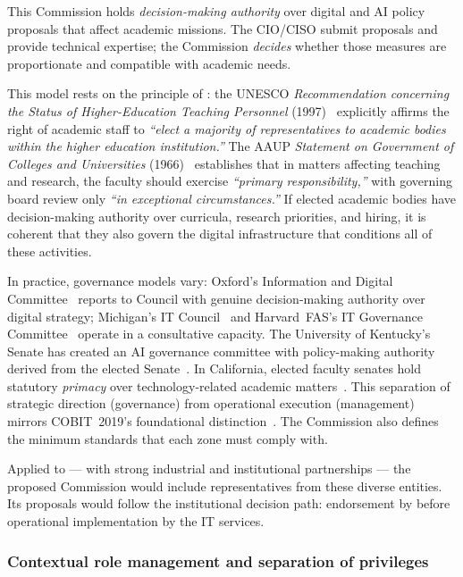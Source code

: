 This Commission holds \emph{decision-making authority} over digital
and AI policy proposals that affect academic missions. The CIO/CISO
submit proposals and provide technical expertise; the Commission
\emph{decides} whether those measures are proportionate and compatible
with academic needs.

\smallskip\noindent
This model rests on the principle of :
the UNESCO \emph{Recommendation concerning the Status of
Higher-Education Teaching Personnel} (1997)~\cite{unesco1997}
explicitly affirms the right of academic staff to \emph{``elect a
majority of representatives to academic bodies within the higher
education institution.''}  The AAUP \emph{Statement on Government of
Colleges and Universities} (1966)~\cite{aaup1966} establishes that in
matters affecting teaching and research, the faculty should exercise
\emph{``primary responsibility,''} with governing board review only
\emph{``in exceptional circumstances.''} If elected academic bodies
have decision-making authority over curricula, research priorities, and
hiring, it is coherent that they also govern the digital infrastructure
that conditions all of these activities.

\smallskip\noindent
In practice, governance models vary: Oxford's Information and Digital
Committee~\cite{oxford-infosec} reports to Council with genuine
decision-making authority over digital strategy; Michigan's IT
Council~\cite{umich-it-council} and Harvard~FAS's IT Governance
Committee~\cite{harvard-it-governance} operate in a consultative
capacity. The University of Kentucky's Senate has created an AI
governance committee with policy-making authority derived from the
elected Senate~\cite{uk-senate-ai}. In California, elected faculty
senates hold statutory \emph{primacy} over technology-related academic
matters~\cite{asccc-ai}. This separation of strategic direction
(governance) from operational execution (management) mirrors
COBIT~2019's foundational distinction~\cite{cobit}. The Commission
also defines the minimum standards that each zone must comply with.

\smallskip\noindent
Applied to  ---  with strong industrial and institutional
partnerships --- the proposed Commission would include representatives
from these diverse entities. Its proposals would follow the
institutional decision path: endorsement by  before operational
implementation by the IT services.

\subsubsection{Contextual role management and separation of privileges}
\label{subsubsec:contextual-roles}

